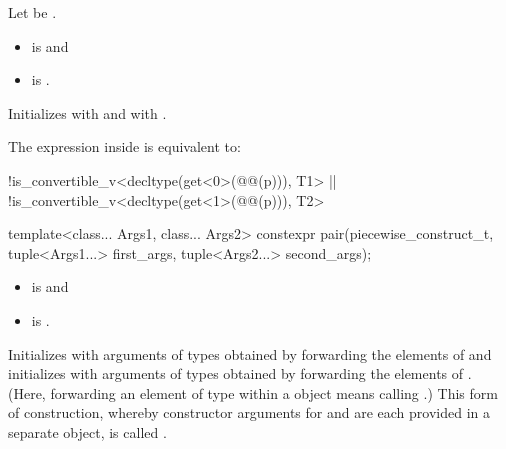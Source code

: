 \documentclass{wg21}
\begin{document}
\begin{itemdescr}
    \pnum
    Let  be .

    \pnum
    \constraints
    \begin{itemize}
        \item
        is  and
        \item
        is .
    \end{itemize}

    \pnum
    \effects
    Initializes  with  and
     with .

    \pnum
    \remarks
    The expression inside  is equivalent to:
    \begin{codeblock}
        !is_convertible_v<decltype(get<0>(@@(p))), T1> ||
        !is_convertible_v<decltype(get<1>(@@(p))), T2>
    \end{codeblock}
\end{itemdescr}

%
\begin{itemdecl}
    template<class... Args1, class... Args2>
    constexpr pair(piecewise_construct_t,
    tuple<Args1...> first_args, tuple<Args2...> second_args);
\end{itemdecl}

\begin{itemdescr}
    \pnum
    \mandates
    \begin{itemize}
        \item {} is  and
        \item {} is .
    \end{itemize}

    \pnum
    \effects
    Initializes  with arguments of types
     obtained by forwarding the elements of 
    and initializes  with arguments of types 
    obtained by forwarding the elements of . (Here, forwarding
    an element  of type  within a  object means calling
    .) This form of construction, whereby constructor
    arguments for  and  are each provided in a separate
     object, is called .
\end{itemdescr}
\end{document}
